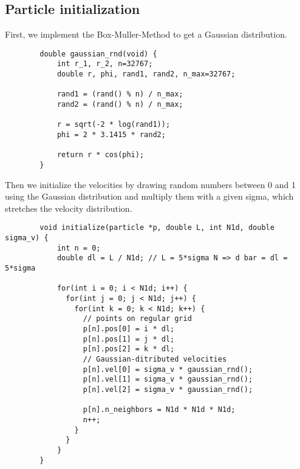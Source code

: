 \subsection{Particle initialization}
    First, we implement the Box-Muller-Method to get a Gaussian 
    distribution. \\
    \begin{lstlisting}
        double gaussian_rnd(void) {
            int r_1, r_2, n=32767;
            double r, phi, rand1, rand2, n_max=32767;

            rand1 = (rand() % n) / n_max;
            rand2 = (rand() % n) / n_max;

            r = sqrt(-2 * log(rand1));
            phi = 2 * 3.1415 * rand2;

            return r * cos(phi);
        }\end{lstlisting} 
    Then we initialize the velocities by drawing random numbers between 0 and 
    1 using the Gaussian distribution and multiply them with a given sigma,
    which stretches the velocity distribution. \\
    \begin{lstlisting}
        void initialize(particle *p, double L, int N1d, double sigma_v) {
            int n = 0;
            double dl = L / N1d; // L = 5*sigma N => d bar = dl = 5*sigma

            for(int i = 0; i < N1d; i++) {
              for(int j = 0; j < N1d; j++) {
                for(int k = 0; k < N1d; k++) {
                  // points on regular grid
                  p[n].pos[0] = i * dl;
                  p[n].pos[1] = j * dl;
                  p[n].pos[2] = k * dl;
                  // Gaussian-ditributed velocities
                  p[n].vel[0] = sigma_v * gaussian_rnd();
                  p[n].vel[1] = sigma_v * gaussian_rnd();
                  p[n].vel[2] = sigma_v * gaussian_rnd();

                  p[n].n_neighbors = N1d * N1d * N1d;
                  n++;
                }
              }
            }
        }\end{lstlisting}

